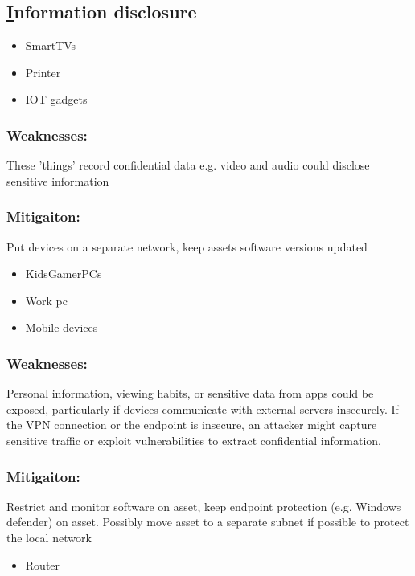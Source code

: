 \documentclass[
	letterpaper, %
	10pt, %
	unnumberedsections, %
	twoside, %
]{APAAssignment}
\begin{document}
\begin{singlespace}
\subsection{\underline{I}nformation disclosure}



	\begin{itemize}
		\item SmartTVs
		\item Printer 
		\item IOT gadgets 
	\end{itemize}
	
	\subsubsection{Weaknesses:} These 'things' record confidential data e.g. video and audio could disclose sensitive information  
	\subsubsection{Mitigaiton:} Put devices on a separate network, keep assets software versions updated
	
	\begin{itemize}
		\item KidsGamerPCs
		\item Work pc
		\item Mobile devices
	\end{itemize}
	
	\subsubsection{Weaknesses:} Personal information, viewing habits, or sensitive data from apps could be exposed, particularly if devices communicate with external servers insecurely. If the VPN connection or the endpoint is insecure, an attacker might capture sensitive traffic or exploit vulnerabilities to extract confidential information.

	\subsubsection{Mitigaiton:} Restrict and monitor software on asset, keep endpoint protection (e.g. Windows defender) on asset. Possibly move asset to a separate subnet if possible to protect the local network

	\begin{itemize}
		\item Router
	\end{itemize}
	

\end{singlespace}
\end{document}
